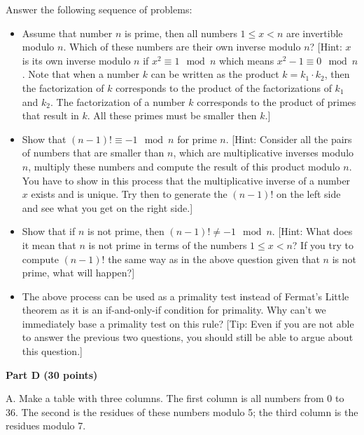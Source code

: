 \documentclass{article}
\begin{document}
 Answer the following sequence of problems:
\begin{itemize}

\item Assume that number $n$ is prime, then all numbers $1 \leq x < n$
  are invertible modulo $n$. Which of these numbers are their own
  inverse modulo $n$?  [Hint: $x$ is its own inverse modulo $n$ if
    $x^{2} \equiv 1 \mod n$ which means $x^{2}-1 \equiv 0 \mod
    n$. Note that when a number $k$ can be written as the product $k =
    k_1 \cdot k_2$, then the factorization of $k$ corresponds to the
    product of the factorizations of $k_1$ and $k_2$. The
    factorization of a number $k$ corresponds to the product of primes
    that result in $k$. All these primes must be smaller then $k$.]

\item Show that $(n-1)! \equiv -1 \mod n$ for prime $n$. [Hint:
  Consider all the pairs of numbers that are smaller than $n$, which
  are multiplicative inverses modulo $n$, multiply these numbers and
  compute the result of this product modulo $n$. You have to show in
  this process that the multiplicative inverse of a number $x$ exists
  and is unique. Try then to generate the $(n-1)!$ on the left side
  and see what you get on the right side.]

\item Show that if $n$ is not prime, then $(n-1)! \neq -1 \mod
  n$. [Hint: What does it mean that $n$ is not prime in terms of the
    numbers $1 \leq x < n$? If you try to compute $(n-1)!$ the same
    way as in the above question given that $n$ is not prime, what
    will happen?]

\item The above process can be used as a primality test instead of
  Fermat's Little theorem as it is an if-and-only-if condition for
  primality. Why can't we immediately base a primality test on this
  rule? [Tip: Even if you are not able to answer the previous two
    questions, you should still be able to argue about this
    question.]\\

\end{itemize}

\begin{center}
{\bf Part D (30 points)}
\end{center}



\noindent A. Make a table with three columns. The first column is all numbers
from 0 to 36. The second is the residues of these numbers modulo 5;
the third column is the residues modulo 7.\\
\end{document}
